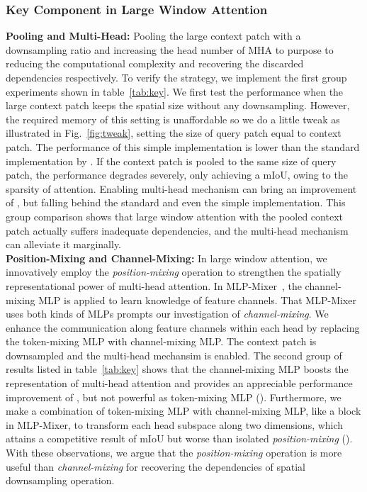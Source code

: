\documentclass[10pt,twocolumn,letterpaper]{article}
\begin{document}
\subsubsection{Key Component in Large Window Attention}
\textbf{Pooling and Multi-Head:} Pooling the large context patch with a downsampling ratio  and increasing the head number of MHA to  purpose to reducing the computational complexity and recovering the discarded dependencies respectively. To verify the strategy, we implement the first group experiments shown in table~\ref{tab:key}. We first test the performance when the large context patch keeps the spatial size without any downsampling. However, the required memory of this setting is unaffordable so we do a little tweak as illustrated in Fig.~\ref{fig:tweak}, setting the size of query patch equal to context patch. The performance of this simple implementation is lower than the standard implementation by . If the context patch is pooled to the same size of query patch, the performance degrades severely, only achieving a  mIoU, owing to the sparsity of attention. Enabling multi-head mechanism can bring an improvement of , but falling behind the standard and even the simple implementation. This group comparison shows that large window attention with the pooled context patch actually suffers inadequate dependencies, and the multi-head mechanism can alleviate it marginally.
\medskip\\
\noindent
\textbf{Position-Mixing and Channel-Mixing:} In large window attention, we innovatively employ the \textit{position-mixing} operation to strengthen the spatially representational power of multi-head attention. In MLP-Mixer~\cite{tolstikhin2021mlp}, the channel-mixing MLP is applied to learn knowledge of feature channels. That MLP-Mixer uses both kinds of MLPs prompts our investigation of \textit{channel-mixing}. We enhance the communication along feature channels within each head by replacing the token-mixing MLP with channel-mixing MLP. The context patch is downsampled and the multi-head mechansim is enabled. The second group of results listed in table~\ref{tab:key} shows that the channel-mixing MLP boosts the representation of multi-head attention and provides an appreciable performance improvement of , but not powerful as token-mixing MLP (). Furthermore, we make a combination of token-mixing MLP with channel-mixing MLP, like a block in MLP-Mixer, to transform each head subspace along two dimensions, which attains a competitive result of  mIoU but worse than isolated \textit{position-mixing} (). With these observations, we argue that the \textit{position-mixing} operation is more useful than \textit{channel-mixing} for recovering the dependencies of spatial downsampling operation. 
\end{document}
